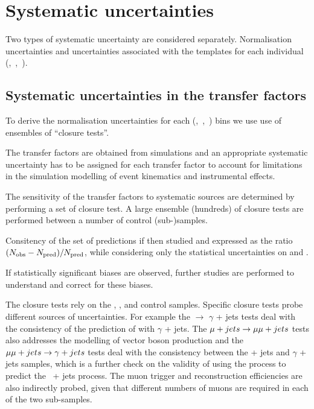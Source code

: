 \section{Systematic uncertainties}
\label{sec:systematics}


Two types of systematic uncertainty are considered separately. Normalisation uncertainties 
and uncertainties associated with the \mht templates for each individual (\njet,~\nb,~\scalht).



\subsection{Systematic uncertainties in the transfer factors}

To derive the normalisation uncertainties for each (\njet,~\nb,~\scalht) bins we use use of ensembles of ``closure tests''.

\label{sec:bkgdnorm-syst}

The transfer factors are obtained from simulations and an appropriate systematic uncertainty has to be assigned
for each transfer factor to account for limitations in the simulation modelling of event kinematics
 and instrumental effects. 

The sensitivity of the transfer factors to systematic sources are determined by performing a set of closure test.
 A large ensemble (\ie hundreds) of closure tests are performed between a number of control (sub-)samples.

Consitency of the set of predictions if then studied and expressed as the ratio $(N_{\textrm{obs}} - N_{\textrm{pred}})/N_{\textrm{pred}}$, while considering only
the statistical uncertainties on \npre and \nobs. 

If statistically significant biases are observed, further studies are performed to understand and correct for
these biases.


The closure tests rely on the \mj, \mmj, and \gj control samples. Specific closure tests probe different sources of uncertainties. 
For example the \mj $\rightarrow$ $\gamma$ + jets tests deal with the consistency
of the prediction of \wej with $\gamma$ + jets. The $\mu + jets \rightarrow \mu\mu + jets$ tests also addresses the modelling of
vector boson production and the $\mu\mu + jets \rightarrow \gamma + jets$ tests deal with the consistency between the \zee + jets and $\gamma$ + jets samples, which
is a further check on the validity of using the \gj process to predict the \znunu\, + jets process. The muon trigger and reconstruction
efficiencies are also indirectly probed, given that different numbers of muons are required in each of the two sub-samples.

